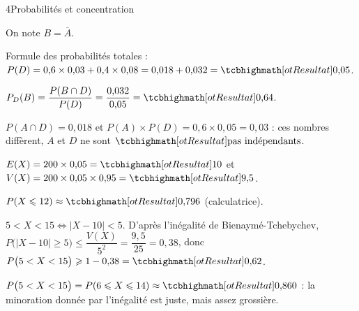 

\begin{corrigeBac}{4}{Probabilités et concentration}
\begin{questions}
  \item On note $B=\overline A$.
\begin{center}
\end{center}
  \item Formule des probabilités totales : $P(D)=0{,}6\times0{,}03+0{,}4\times0{,}08=0{,}018+0{,}032=\res{0{,}05}$. 
  \item $P_D(B)=\dfrac{P(B\cap D)}{P(D)}=\dfrac{0{,}032}{0{,}05}=\res{0{,}64}$. 
  \item $P(A\cap D)=0{,}018$ et $P(A)\times P(D)=0{,}6\times0{,}05=0{,}03$ : ces nombres diffèrent, $A$ et $D$ ne sont
    $\res{\text{pas indépendants}}$. 
\end{questions}
\begin{questions}[resume]
  \item $E(X)=200\times0{,}05=\res{10}$ et $V(X)=200\times0{,}05\times0{,}95=\res{9{,}5}$. 
  \item $P(X\leq12)\approx\res{0{,}796}$ (calculatrice). 
  \item $5<X<15\iff|X-10|<5$. D'après l'inégalité de Bienaymé-Tchebychev,
    $P\big(|X-10|\geq5\big)\leq\dfrac{V(X)}{5^{2}}=\dfrac{9{,}5}{25}=0{,}38$, donc $P\big(5<X<15\big)\geq1-0{,}38=\res{0{,}62}$. 
  \item $P\big(5<X<15\big)=P(6\leq X\leq14)\approx\res{0{,}860}$ : la minoration donnée par l'inégalité est juste, mais assez grossière. 
\end{questions}
\end{corrigeBac}

